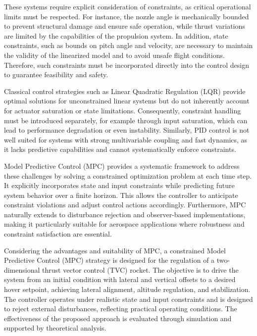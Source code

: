\documentclass[10pt,twocolumn,twoside]{IEEEtran}
\begin{document}
These systems require explicit consideration of constraints, as critical operational limits must be respected. For instance, the nozzle angle is mechanically bounded to prevent structural damage and ensure safe operation, while thrust variations are limited by the capabilities of the propulsion system. In addition, state constraints, such as bounds on pitch angle and velocity, are necessary to maintain the validity of the linearized model and to avoid unsafe flight conditions. Therefore, such constraints must be incorporated directly into the control design to guarantee feasibility and safety.

Classical control strategies such as Linear Quadratic Regulation (LQR) provide optimal solutions for unconstrained linear systems but do not inherently account for actuator saturation or state limitations. Consequently, constraint handling must be introduced separately, for example through input saturation, which can lead to performance degradation or even instability. Similarly, PID control is not well suited for systems with strong multivariable coupling and fast dynamics, as it lacks predictive capabilities and cannot systematically enforce constraints.

Model Predictive Control (MPC) provides a systematic framework to address these challenges by solving a constrained optimization problem at each time step. It explicitly incorporates state and input constraints while predicting future system behavior over a finite horizon. This allows the controller to anticipate constraint violations and adjust control actions accordingly. Furthermore, MPC naturally extends to disturbance rejection and observer-based implementations, making it particularly suitable for aerospace applications where robustness and constraint satisfaction are essential.

Considering the advantages and suitability of MPC, a constrained Model Predictive Control (MPC) strategy is designed for the regulation of a two-dimensional thrust vector control (TVC) rocket. The objective is to drive the system from an initial condition with lateral and vertical offsets to a desired hover setpoint, achieving lateral alignment, altitude regulation, and stabilization. The controller operates under realistic state and input constraints and is designed to reject external disturbances, reflecting practical operating conditions. The effectiveness of the proposed approach is evaluated through simulation and supported by theoretical analysis.
\end{document}
